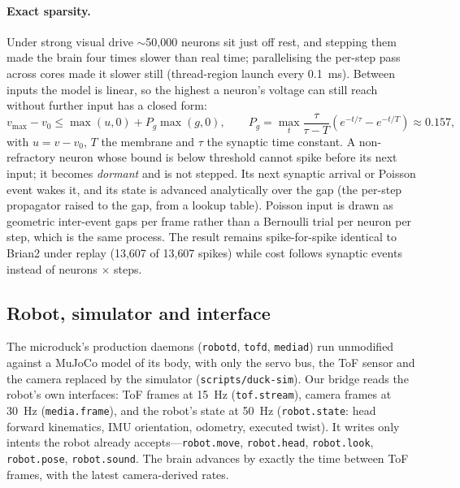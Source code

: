 \documentclass[10pt,a4paper]{article}
\begin{document}
\paragraph{Exact sparsity.} Under strong visual drive $\sim$50{,}000 neurons sit just off rest, and
stepping them made the brain four times slower than real time; parallelising the per-step pass across
cores made it slower still (thread-region launch every \SI{0.1}{ms}). Between inputs the model is linear,
so the highest a neuron's voltage can still reach without further input has a closed form:
\begin{equation}
v_{\max} - v_0 \le \max(u,0) + P_g \max(g,0),\qquad P_g = \max_t \frac{\tau}{\tau - T}\left(e^{-t/\tau}-e^{-t/T}\right) \approx 0.157,
\end{equation}
with $u = v - v_0$, $T$ the membrane and $\tau$ the synaptic time constant. A non-refractory neuron whose
bound is below threshold cannot spike before its next input; it becomes \emph{dormant} and is not stepped.
Its next synaptic arrival or Poisson event wakes it, and its state is advanced analytically over the gap
(the per-step propagator raised to the gap, from a lookup table). Poisson input is drawn as geometric
inter-event gaps per frame rather than a Bernoulli trial per neuron per step, which is the same process.
The result remains spike-for-spike identical to Brian2 under replay (13{,}607 of 13{,}607 spikes) while
cost follows synaptic events instead of neurons $\times$ steps.

\subsection{Robot, simulator and interface}

The microduck's production daemons (\texttt{robotd}, \texttt{tofd}, \texttt{mediad}) run unmodified
against a MuJoCo \cite{todorov2012} model of its body, with only the servo bus, the ToF sensor and the
camera replaced by the simulator (\texttt{scripts/duck-sim}). Our bridge reads the robot's own interfaces:
ToF frames at \SI{15}{Hz} (\texttt{tof.stream}), camera frames at \SI{30}{Hz} (\texttt{media.frame}), and
the robot's state at \SI{50}{Hz} (\texttt{robot.state}: head forward kinematics, IMU orientation,
odometry, executed twist). It writes only intents the robot already accepts---\texttt{robot.move},
\texttt{robot.head}, \texttt{robot.look}, \texttt{robot.pose}, \texttt{robot.sound}. The brain advances by
exactly the time between ToF frames, with the latest camera-derived rates.
\end{document}
